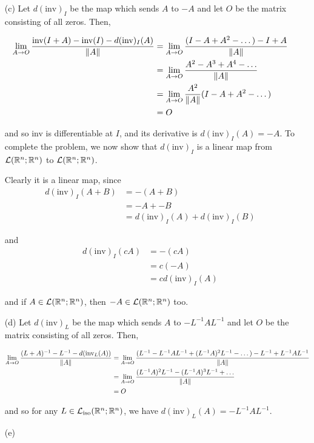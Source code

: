 \documentclass{hmwk}
\begin{document}
\begin{solution}
\begin{itemize}
    \item[(c)] Let $d(\text{inv})_I$ be the map which sends $A$ to $-A$ and let $O$ be the matrix consisting of all zeros. Then,

    \begin{align*}
        \lim_{A \rightarrow O}\frac{\text{inv}(I + A) - \text{inv}(I) - d(\text{inv})_I(A)}{\|A\|}
        &= \lim_{A \rightarrow O}\frac{(I - A + A^2 - \dots) - I + A}{\|A\|} \\
        &= \lim_{A \rightarrow O}\frac{A^2 - A^3 + A^4 - \dots}{\|A\|} \\
        &= \lim_{A \rightarrow O} \frac{A^2}{\|A\|}(I - A + A^2 - \dots)\\
        &= O
    \end{align*}
    
    \pre and so inv is differentiable at $I$, and its derivative is $d(\text{inv})_I(A) = -A$. To complete the problem, we now show that $d(\text{inv})_I$ is a linear map from $\mathcal{L}(\mathbb{R}^n;\mathbb{R}^n)$ to $\mathcal{L}(\mathbb{R}^n;\mathbb{R}^n)$.

    \pre Clearly it is a linear map, since 
    \begin{align*}
        d(\text{inv})_I(A + B) &= - (A + B) \\
        &= -A + -B \\
        &= d(\text{inv})_I(A) + d(\text{inv})_I(B)
    \end{align*}

    \pre and 
    \begin{align*}
        d(\text{inv})_I(cA) &= -(cA) \\
        &= c(-A) \\
        &= cd(\text{inv})_I(A)
    \end{align*}

    \pre and if $A \in \mathcal{L}(\mathbb{R}^n; \mathbb{R}^n)$, then $-A \in \mathcal{L}(\mathbb{R}^n;\mathbb{R}^n)$ too. 

    \item[(d)] Let $d(\text{inv})_L$ be the map which sends $A$ to $-L^{-1}AL^{-1}$ and let $O$ be the matrix consisting of all zeros. Then,

    \begin{align*}
        \lim_{A \rightarrow O}\frac{(L+A)^{-1} - L^{-1} - d(\text{inv}_L(A))}{\|A\|} &= \lim_{A \rightarrow O}\frac{(L^{-1} - L^{-1}AL^{-1} + (L^{-1}A)^2L^{-1} - \dots) - L^{-1} + L^{-1}AL^{-1}}{\|A\|} \\
        &= \lim_{A \rightarrow O}\frac{(L^{-1}A)^2L^{-1} - (L^{-1}A)^3L^{-1} + \dots }{\|A\|} \\
        &= O
    \end{align*}

    \pre and so for any $L \in \mathcal{L}_{\text{iso}}(\mathbb{R}^n;\mathbb{R}^n)$, we have $d(\text{inv})_L(A) = -L^{-1}AL^{-1}$.

    \item[(e)] 
\end{itemize}
\end{solution}
\end{document}
